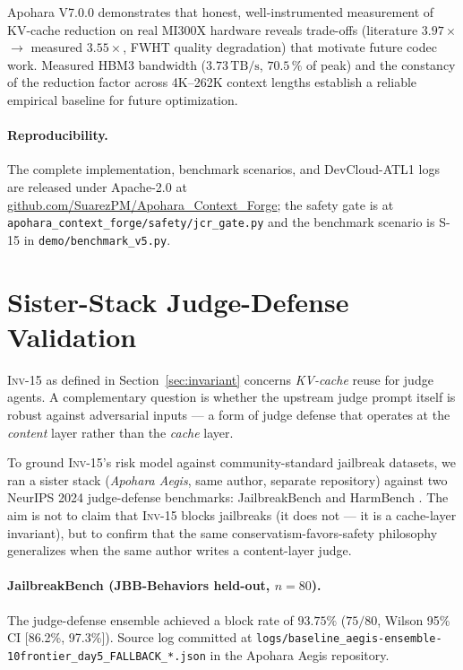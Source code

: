 \documentclass[10pt,twocolumn]{article}
\newcommand{\INV}[1]{\textsc{Inv-#1}}
\newcommand{\code}[1]{\texttt{\small #1}}
\begin{document}
Apohara V7.0.0 demonstrates that honest, well-instrumented measurement of
KV-cache reduction on real MI300X hardware reveals trade-offs (literature
$3.97\times$ $\to$ measured $3.55\times$, FWHT quality degradation) that
motivate future codec work. Measured HBM3 bandwidth ($3.73\,\mathrm{TB/s}$,
$70.5\,\%$ of peak) and the constancy of the reduction factor across
4K--262K context lengths establish a reliable empirical baseline for
future optimization.

\paragraph{Reproducibility.}
The complete implementation, benchmark scenarios, and DevCloud-ATL1 logs
are released under Apache-2.0 at
\href{https://github.com/SuarezPM/Apohara_Context_Forge}%
     {github.com/SuarezPM/Apohara\_Context\_Forge}; the safety gate is at
\code{apohara\_context\_forge/safety/jcr\_gate.py} and the benchmark
scenario is S-15 in \code{demo/benchmark\_v5.py}.

\section{Sister-Stack Judge-Defense Validation}
\label{sec:judge-defense}

\INV{15} as defined in Section~\ref{sec:invariant} concerns
\emph{KV-cache} reuse for judge agents. A complementary question is
whether the upstream judge prompt itself is robust against
adversarial inputs --- a form of judge defense that operates at the
\emph{content} layer rather than the \emph{cache} layer.

To ground \INV{15}'s risk model against community-standard
jailbreak datasets, we ran a sister stack (\emph{Apohara Aegis},
same author, separate repository) against two NeurIPS 2024 judge-defense
benchmarks: JailbreakBench \cite{jailbreakbench} and HarmBench
\cite{harmbench}. The aim is not to claim that \INV{15} blocks
jailbreaks (it does not --- it is a cache-layer invariant), but to
confirm that the same conservatism-favors-safety philosophy
generalizes when the same author writes a content-layer judge.

\paragraph{JailbreakBench (JBB-Behaviors held-out, $n{=}80$).}
The judge-defense ensemble achieved a block rate of
$93.75\%$ ($75/80$, Wilson 95\% CI
[86.2\%, 97.3\%]). Source log committed at
\code{logs/baseline\_\allowbreak{}aegis-ensemble-\allowbreak{}10frontier\_\allowbreak{}day5\_\allowbreak{}FALLBACK\_\allowbreak{}*.json}
in the Apohara Aegis repository.
\end{document}
